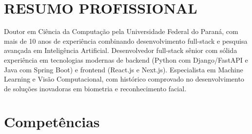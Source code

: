 \documentclass[12pt,a4paper,sans]{moderncv}
\begin{document}
\makecvtitle

\vspace{12pt}
\section{RESUMO PROFISSIONAL}

\small{Doutor em Ciência da Computação pela Universidade Federal do Paraná, com mais de 10 anos de experiência combinando desenvolvimento full-stack e pesquisa avançada em Inteligência Artificial. Desenvolvedor full-stack sênior com sólida experiência em tecnologias modernas de backend (Python com Django/FastAPI e Java com Spring Boot) e frontend (React.js e Next.js). Especialista em Machine Learning e Visão Computacional, com histórico comprovado no desenvolvimento de soluções inovadoras em biometria e reconhecimento facial.}

\vspace{12pt}
\section{Competências}
\end{document}
